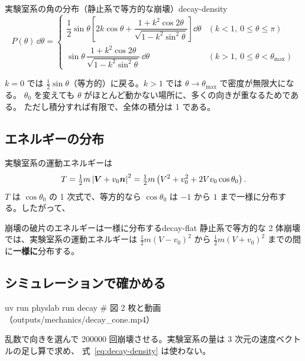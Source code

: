 \begin{result}{実験室系の角の分布（静止系で等方的な崩壊）}{decay-density}
\begin{equation}
  P(\theta)\,\dd\theta=
  \begin{cases}
    \dfrac12\sin\theta\left[2k\cos\theta+\dfrac{1+k^2\cos2\theta}{\sqrt{1-k^2\sin^2\theta}}\right]\dd\theta
      & (k<1,\ 0\le\theta\le\pi)\\[1.2em]
    \sin\theta\,\dfrac{1+k^2\cos2\theta}{\sqrt{1-k^2\sin^2\theta}}\,\dd\theta
      & (k>1,\ 0\le\theta<\theta_{\max})
  \end{cases}
  \label{eq:decay-density}
\end{equation}
\end{result}

$k=0$ では $\tfrac12\sin\theta$（等方的）に戻る。$k>1$ では $\theta\to\theta_{\max}$ で密度が無限大になる。
$\theta_0$ を変えても $\theta$ がほとんど動かない場所に、多くの向きが重なるためである。
ただし積分すれば有限で、全体の積分は 1 である。

\subsection{エネルギーの分布}

実験室系の運動エネルギーは
\begin{equation}
  T=\tfrac12m\left\lvert \bm V+v_0\bm n\right\rvert^2=\tfrac12m\left(V^2+v_0^2+2Vv_0\cos\theta_0\right).
  \label{eq:decay-energy}
\end{equation}
$T$ は $\cos\theta_0$ の 1 次式で、等方的なら $\cos\theta_0$ は $-1$ から $1$ まで一様に分布する。したがって、

\begin{result}{崩壊の破片のエネルギーは一様に分布する}{decay-flat}
静止系で等方的な 2 体崩壊では、実験室系の運動エネルギーは
$\tfrac12m(V-v_0)^2$ から $\tfrac12m(V+v_0)^2$ までの間に\textbf{一様に}分布する。
\end{result}

\subsection{シミュレーションで確かめる}

\begin{simbox}
\begin{terminal}
uv run physlab run decay      # 図 2 枚と動画（outputs/mechanics/decay_cone.mp4）
\end{terminal}
乱数で向きを選んで \num{200000} 回崩壊させる。実験室系の量は 3 次元の速度ベクトルの足し算で求め、
式~\eqref{eq:decay-density} は使わない。
\end{simbox}

